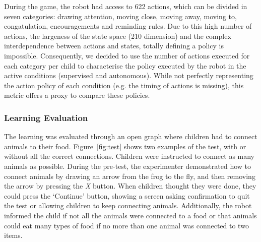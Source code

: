 During the game, the robot had access to 622 actions, which can be divided in seven categories: drawing attention, moving close, moving away, moving to, congatulation, encouragements and reminding rules. Due to this high number of actions, the largeness of the state space (210 dimension) and the complex interdependence between actions and states, totally defining a policy is impossible. Consequently, we decided to use the number of actions executed for each category per child to characterise the policy executed by the robot in the active conditions (supervised and autonomous). While not perfectly representing the action policy of each condition (e.g. the timing of actions is missing), this metric offers a proxy to compare these policies. 

\subsubsection{Learning Evaluation}
The learning was evaluated through an open graph where children had to connect animals to their food. Figure~\ref{fig:test} shows two examples of the test, with or without all the correct connections. Children were instructed to connect as many animals as possible. During the pre-test, the experimenter demonstrated how to connect animals by drawing an arrow from the frog to the fly, and then removing the arrow by pressing the \textit{X} button. When children thought they were done, they could press the `Continue' button, showing a screen asking confirmation to quit the test or allowing children to keep connecting animals. Additionally, the robot informed the child if not all the animals were connected to a food or that animals could eat many types of food if no more than one animal was connected to two items. 

